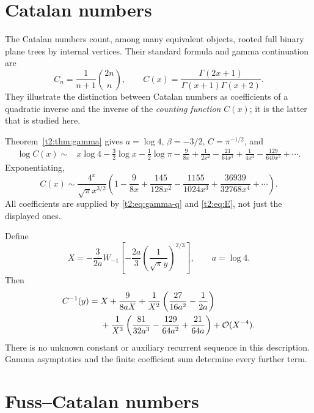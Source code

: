 \documentclass[11pt,openany]{book}
\numberwithin{equation}{chapter}
\theoremstyle{plain}
\theoremstyle{definition}
\theoremstyle{remark}
\begin{document}
\section{Catalan numbers}
\label{t2:subsec:catalan}

The Catalan numbers count, among many equivalent objects, rooted full binary plane trees by internal vertices. Their standard formula and gamma continuation are \cite{oeiscatalan,wlcatalan}
\begin{equation}
 C_n=\frac1{n+1}\binom{2n}{n},\qquad
 C(x)=\frac{\Gamma(2x+1)}{\Gamma(x+1)\Gamma(x+2)}.
 \label{t2:eq:catalan}
\end{equation}
They illustrate the distinction between Catalan numbers as coefficients of a quadratic inverse and the inverse of the \emph{counting function} $C(x)$; it is the latter that is studied here.

Theorem~\ref{t2:thm:gamma} gives $a=\log4$, $\beta=-3/2$, $C=\pi^{-1/2}$, and
\begin{align}
 \log C(x)\sim{}&x\log4-\frac32\log x-\frac12\log\pi
 -\frac9{8x}+\frac1{2x^2}-\frac{21}{64x^3}
 +\frac1{4x^4}-\frac{129}{640x^5}+\cdots.
 \label{t2:eq:catalan-log}
\end{align}
Exponentiating,
\begin{equation}
 C(x)\sim\frac{4^x}{\sqrt\pi x^{3/2}}
 \left(1-\frac9{8x}+\frac{145}{128x^2}
        -\frac{1155}{1024x^3}+\frac{36939}{32768x^4}+\cdots\right).
 \label{t2:eq:catalan-amplitude}
\end{equation}
All coefficients are supplied by \eqref{t2:eq:gamma-q} and \eqref{t2:eq:E}, not just the displayed ones.

Define
\begin{equation}
 X=-\frac3{2a}W_{-1}\!\left[
       -\frac{2a}{3}\left(\frac1{\sqrt\pi y}\right)^{2/3}\right],
 \qquad a=\log4.
 \label{t2:eq:catalan-core}
\end{equation}
Then
\begin{align}
 C^{-1}(y)={}&X+\frac9{8aX}
 +\frac1{X^2}\left(\frac{27}{16a^2}-\frac1{2a}\right)\nonumber\\
 &+\frac1{X^3}\left(\frac{81}{32a^3}-\frac{129}{64a^2}
                    +\frac{21}{64a}\right)+\mathcal O(X^{-4}).
 \label{t2:eq:catalan-inverse}
\end{align}
There is no unknown constant or auxiliary recurrent sequence in this description. Gamma asymptotics and the finite coefficient sum determine every further term.
\section{Fuss--Catalan numbers}
\end{document}
